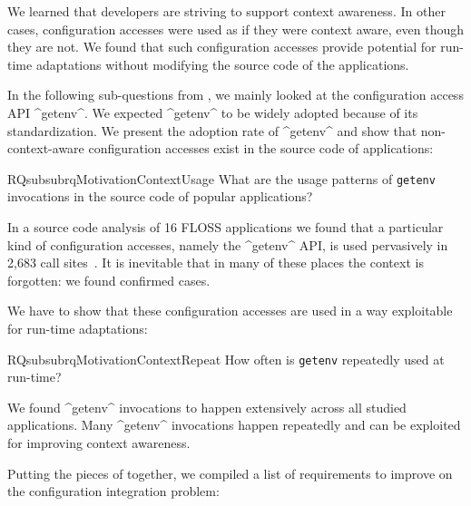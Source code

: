\begin{contribution}
We learned that developers are striving to support context awareness.
In other cases, configuration accesses were used as if they were context aware, even though they are not.
We found that such configuration accesses provide potential for run-time adaptations without modifying the source code of the applications.
\end{contribution}

In the following sub-questions from , we mainly looked at the configuration access API ^getenv^.
We expected ^getenv^ to be widely adopted because of its standardization.
We present the adoption rate of ^getenv^ and show that non-context-aware configuration accesses exist in the source code of applications:

\begin{restatable}{RQsubsub}{rqMotivationContextUsage}
What are the usage patterns of \texttt{getenv} invocations in the source code of popular applications?%
\label{rq:motivation-context-usage}
\end{restatable}

\begin{contribution}
In a source code analysis of 16 FLOSS applications we found that a particular kind of configuration accesses, namely the ^getenv^ API, is used pervasively in 2,683 call sites~\cite{raab2017introducing}.
It is inevitable that in many of these places the context is forgotten: we found confirmed cases.
\end{contribution}

We have to show that these configuration accesses are used in a way exploitable for run-time adaptations:

\begin{restatable}{RQsubsub}{rqMotivationContextRepeat}
How often is \texttt{getenv} repeatedly used at run-time?%
\label{rq:motivation-context-repeat}
\end{restatable}

\begin{contribution}
We found ^getenv^ invocations to happen extensively across all studied applications.
Many ^getenv^ invocations happen repeatedly and can be exploited for improving context awareness.
\end{contribution}

Putting the pieces of  together, we compiled a list of requirements to improve on the configuration integration problem:

